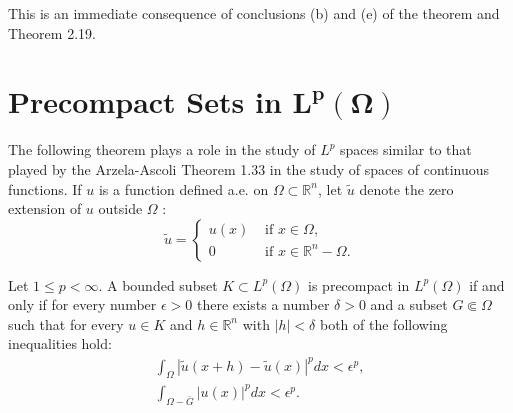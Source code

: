 This is an immediate consequence of conclusions (b) and (e) of the theorem and Theorem 2.19.


\section[Precompact Sets in $L^p(\Omega)$]{Precompact Sets in $\bm{L^p(\Omega)}$}


\begin{para}
  The following theorem plays a role in the study of $L^p$ spaces similar to that played by the Arzela-Ascoli Theorem 1.33 in the study of spaces of continuous functions. If $u$ is a function defined a.e. on $\Omega \subset \mathbb{R}^n$, let $\tilde{u}$ denote the zero extension of $u$ outside $\Omega$ :
  \[
  \tilde{u} =
  \begin{cases}
    u(x) & \text { if } x \in \Omega, \\ 
    0 & \text { if } x \in \mathbb{R}^n-\Omega.
  \end{cases}
  \]
\end{para}

\begin{theorem}
  Let $1 \leq p<\infty$. A bounded subset $K \subset L^p(\Omega)$ is precompact in $L^p(\Omega)$ if and only if for every number $\epsilon>0$ there exists a number $\delta>0$ and a subset $G \Subset \Omega$ such that for every $u \in K$ and $h \in \mathbb{R}^n$ with $|h|<\delta$ both of the following inequalities hold:
  \[
  \begin{array}{r}
  \int_{\Omega}|\tilde{u}(x+h)-\tilde{u}(x)|^p d x<\epsilon^p, \\
  \int_{\Omega-\bar{G}}|u(x)|^p d x<\epsilon^p .
  \end{array}
  \]
\end{theorem}

